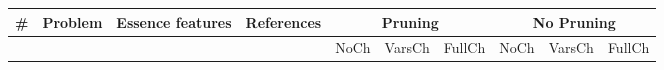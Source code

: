 \begin{sidewaystable}

\footnotesize

    \begin{center}
    \begin{tabular}{r|l|l|l|r|r|r|r|r|r}
 \#     &   Problem                                                         &   Essence features                                                                                          &   References                                                         & \multicolumn{3}{c|}{Pruning}        & \multicolumn{3}{c}{No Pruning}           \\ \hline
        &                                                                   &                                                                                                             &                                                                      & NoCh & VarsCh & FullCh & NoCh & VarsCh & FullCh \\ \hline




\end{tabular}
\end{center}
\end{sidewaystable}
